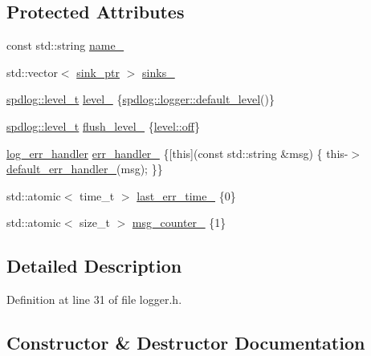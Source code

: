 \subsection*{Protected Attributes}
\begin{DoxyCompactItemize}
\item 
const std\+::string \hyperlink{classspdlog_1_1logger_aad05282c338eb617ca260e40ab8134bc}{name\+\_\+}
\item 
std\+::vector$<$ \hyperlink{namespacespdlog_a422c57d3088160b517e5a74e5f318253}{sink\+\_\+ptr} $>$ \hyperlink{classspdlog_1_1logger_a24a3b3250f3fe52fa7c3053e77076f07}{sinks\+\_\+}
\item 
\hyperlink{namespacespdlog_a8585bf495310a6ce695191739351709b}{spdlog\+::level\+\_\+t} \hyperlink{classspdlog_1_1logger_af167b5b45a369b3cef019b40a87ed71d}{level\+\_\+} \{\hyperlink{classspdlog_1_1logger_a0d0307a6501a9f56689c386a006991fe}{spdlog\+::logger\+::default\+\_\+level}()\}
\item 
\hyperlink{namespacespdlog_a8585bf495310a6ce695191739351709b}{spdlog\+::level\+\_\+t} \hyperlink{classspdlog_1_1logger_a69f7cbb7e1b2d5204a409906a62c1e94}{flush\+\_\+level\+\_\+} \{\hyperlink{namespacespdlog_1_1level_a35f5227e5daf228d28a207b7b2aefc8ba917591d8c0e89f6e6247c95c67809a1a}{level\+::off}\}
\item 
\hyperlink{namespacespdlog_ad3ed787a29f245c833ef66faf48036e2}{log\+\_\+err\+\_\+handler} \hyperlink{classspdlog_1_1logger_a3e623bd54bd38315f66063ae8907ce17}{err\+\_\+handler\+\_\+} \{\mbox{[}this\mbox{]}(const std\+::string \&msg) \{ this-\/$>$\hyperlink{classspdlog_1_1logger_a3432e21bdc19d74024b57cc3f26a8471}{default\+\_\+err\+\_\+handler\+\_\+}(msg); \}\}
\item 
std\+::atomic$<$ time\+\_\+t $>$ \hyperlink{classspdlog_1_1logger_a00677a369b642aec9e8428374ee09df6}{last\+\_\+err\+\_\+time\+\_\+} \{0\}
\item 
std\+::atomic$<$ size\+\_\+t $>$ \hyperlink{classspdlog_1_1logger_a7ef1e291dcb766951fc5c25f110d775f}{msg\+\_\+counter\+\_\+} \{1\}
\end{DoxyCompactItemize}


\subsection{Detailed Description}


Definition at line 31 of file logger.\+h.



\subsection{Constructor \& Destructor Documentation}
\mbox{\label{classspdlog_1_1logger_a5d3b321a0319e9b8b27bf04f206a9900}} 

